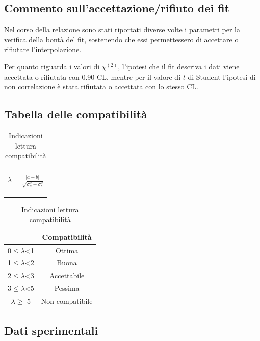 \documentclass{article}
\begin{document}
\subsection{Commento sull'accettazione/rifiuto dei fit}
Nel corso della relazione sono stati riportati diverse volte i parametri per la verifica della bontà del fit, sostenendo che essi permettessero di accettare o rifiutare l'interpolazione.


Per quanto riguarda i valori di $\chi^{(2)}$, l'ipotesi che il fit descriva i dati viene accettata o rifiutata con 0.90 CL, mentre
per il valore di $t$ di Student l'ipotesi di non correlazione è stata rifiutata o accettata con lo stesso CL.


\subsection{Tabella delle compatibilità}
\medskip
\begin{table}[H]
    \centering
    \begin{tabular}{c}
        \begin{Large}
        $\lambda=\frac{|a-b|}{\sqrt{\sigma_a^2+\sigma_b^2}}$
        \end{Large}\\
    \end{tabular}
    \hspace{0.5cm}
    \begin{tabular}{cc}
        \toprule
        &       \textbf{Compatibilità   }       \\
        \midrule
        0$\leq \lambda$<1   &Ottima                 \\
        1$\leq \lambda$<2   &Buona                  \\
        2$\leq \lambda$<3   &Accettabile            \\
        3$\leq\lambda$<5   &Pessima                \\
        $ \lambda \geq $  5     &Non compatibile        \\
        \bottomrule
    \end{tabular}
    \caption{Indicazioni lettura compatibilità}
    \label{tab:compatibilità}
\end{table}

\subsection{Dati sperimentali}
\end{document}
